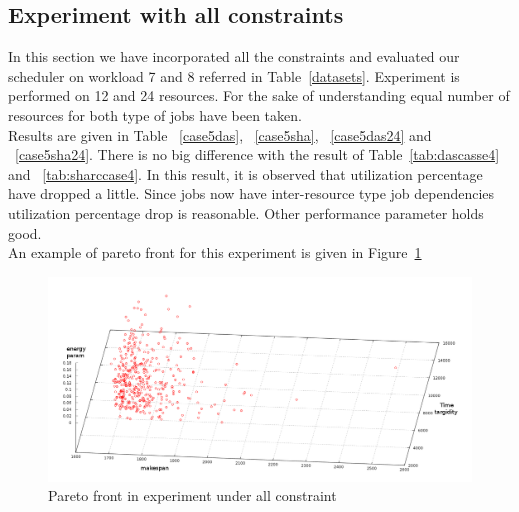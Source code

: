 \subsection{Experiment with all constraints}
In this section we have incorporated all the constraints and evaluated our scheduler on workload 7 and 8 referred in Table~\ref{datasets}. Experiment is performed on 12 and 24 resources. For the sake of understanding equal number of resources for both type of jobs have been taken. \\
Results are given in Table ~\ref{case5das}, ~\ref{case5sha}, ~\ref{case5das24} and ~\ref{case5sha24}. There is no big difference with the result of Table~\ref{tab:dascasse4} and ~\ref{tab:sharccase4}. In this result, it is  observed that utilization percentage have dropped a little. Since jobs now have inter-resource type job dependencies utilization percentage drop is reasonable. Other performance parameter holds good. \\
An example of pareto front for this experiment is given in Figure~\ref{pareto3}  
\begin{figure}[h]
    \centering
    \includegraphics[width=1.0\columnwidth]{pareto3}
    \caption{Pareto front in experiment under all constraint}
    \label{pareto3}    
\end{figure}
    

